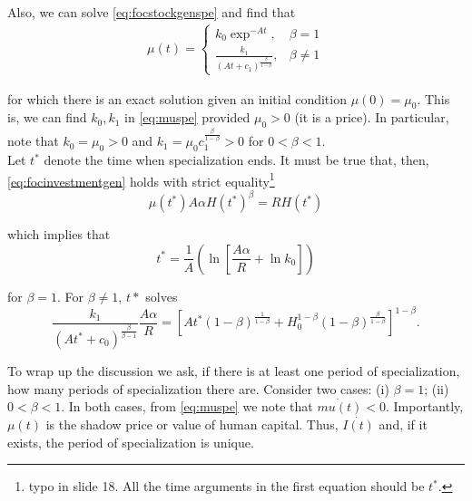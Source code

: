 \indent Also, we can solve \eqref{eq:focstockgenspe} and find that
\begin{eqnarray}
\mu(t) =
\begin{cases}
k_{0} \exp^{-At}, & \beta = 1 \\
\frac{k_{1}}{(At + c_{1})^{\frac{\beta}{1-\beta}}}, & \beta \neq 1 \label{eq:muspe}
\end{cases}
\end{eqnarray}

\noindent for which there is an exact solution given an initial condition $\mu(0) = \mu_{0}$. This is, we can find $k_{0}, k_{1}$ in \eqref{eq:muspe} provided $\mu_{0} > 0$ (it is a price). In particular, note that $k_{0} = \mu_{0} > 0$ and $k_{1} = \mu_{0} c_{1}^{\frac{\beta}{1-\beta}} > 0$ for $0<\beta<1$.\\
\indent Let $t^*$ denote the time when specialization ends. It must be true that, then, \eqref{eq:focinvestmentgen} holds with strict equality\footnote{typo in slide 18. All the time arguments in the first equation should be $t^*$.}
\begin{equation}
\mu(t^*) A \alpha H(t^*)^{\beta} = RH(t^*)
\end{equation}

\noindent which implies that 
\begin{equation}
t^* = \frac{1}{A} \left( \ln \left[ \frac{A\alpha}{R} + \ln k_{0} \right] \right)
\end{equation}

\noindent for $\beta = 1$. For $\beta \neq 1$, $t*$ solves
\begin{equation}
\frac{k_{1}}{ \left( At^* + c_{0} \right)^{\frac{\beta}{\beta-1}}} \frac{A \alpha}{R} = \left[ At^* \left( 1 - \beta \right)^{\frac{1}{1 - \beta}} + H_{0}^{1 - \beta} \left( 1 - \beta \right)^{\frac{\beta}{1 - \beta}} \right]^{1 - \beta}.
\end{equation}

\indent To wrap up the discussion we ask, if there is at least one period of specialization, how many periods of specialization there are. Consider two cases: (i) $\beta = 1$; (ii) $0 < \beta < 1$. In both cases, from \eqref{eq:muspe} we note that $\dot{mu(t)} < 0$. Importantly, $\mu(t)$ is the shadow price or value of human capital. Thus, $\dot{I(t)}$ and, if it exists, the period of specialization is unique.
 
